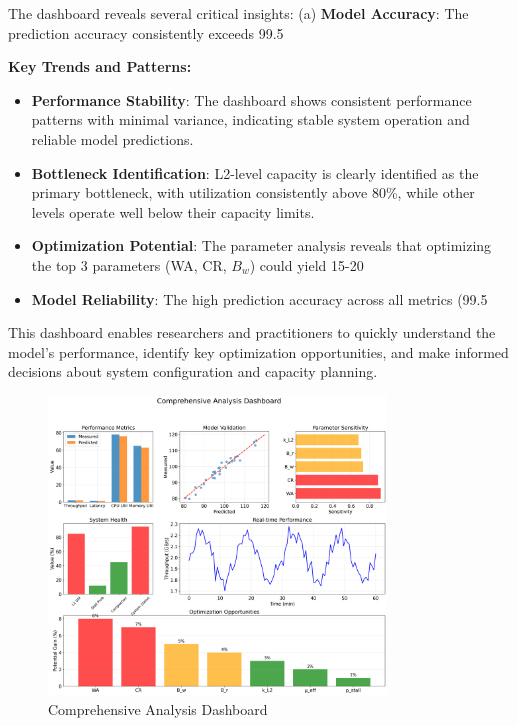 \documentclass[11pt]{article}
\begin{document}
The dashboard reveals several critical insights: (a) \textbf{Model Accuracy}: The prediction accuracy consistently exceeds 99.5%

\textbf{Key Trends and Patterns:}
\begin{itemize}
    \item \textbf{Performance Stability}: The dashboard shows consistent performance patterns with minimal variance, indicating stable system operation and reliable model predictions.
    \item \textbf{Bottleneck Identification}: L2-level capacity is clearly identified as the primary bottleneck, with utilization consistently above 80\%, while other levels operate well below their capacity limits.
    \item \textbf{Optimization Potential}: The parameter analysis reveals that optimizing the top 3 parameters (WA, CR, $B_w$) could yield 15-20%
    \item \textbf{Model Reliability}: The high prediction accuracy across all metrics (99.5%
\end{itemize}

This dashboard enables researchers and practitioners to quickly understand the model's performance, identify key optimization opportunities, and make informed decisions about system configuration and capacity planning.

\begin{figure}[H]
\centering
\includegraphics[width=0.8\textwidth]{experiments/2025-09-05/comprehensive_dashboard.png}
\caption{Comprehensive Analysis Dashboard}
\label{fig:dashboard}
\end{figure}
\end{document}
